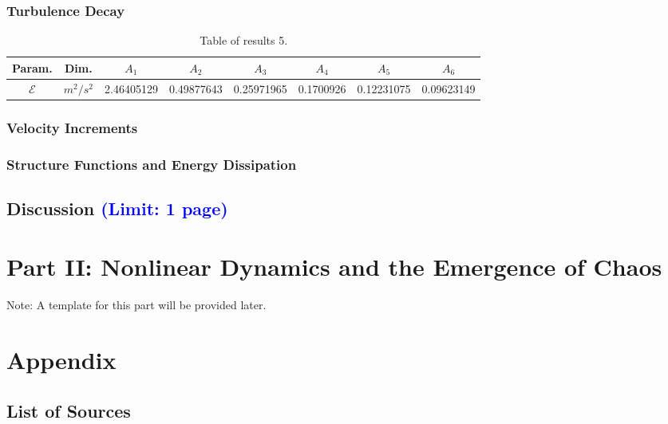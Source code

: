 \documentclass[11pt,titlepage]{article}
\begin{document}
\subsubsection{Turbulence Decay}
\begin{table}[h!]
\centering
\caption{Table of results 5.}
    \begin{tabular}{ | c | c | c | c | c | c | c | c |}
        \hline
        Param. & Dim. & $A_1$ & $A_2$ & $A_3$ & $A_4$ & $A_5$ & $A_6$ \\
        \hline
        $\mathcal{E}$ &$m^2/s^2$ &2.46405129 &0.49877643 &0.25971965 &0.1700926 & 0.12231075& 0.09623149 \\
        \hline
    \end{tabular}
\end{table}

\subsubsection{Velocity Increments}

\subsubsection{Structure Functions and Energy Dissipation}

\subsection{Discussion \textcolor{blue}{(Limit: 1 page)}} %


\section{Part II: Nonlinear Dynamics and the Emergence of Chaos}

Note: A template for this part will be provided later.





\clearpage
\appendix
\section*{Appendix}
\subsection*{List of Sources}
\end{document}
